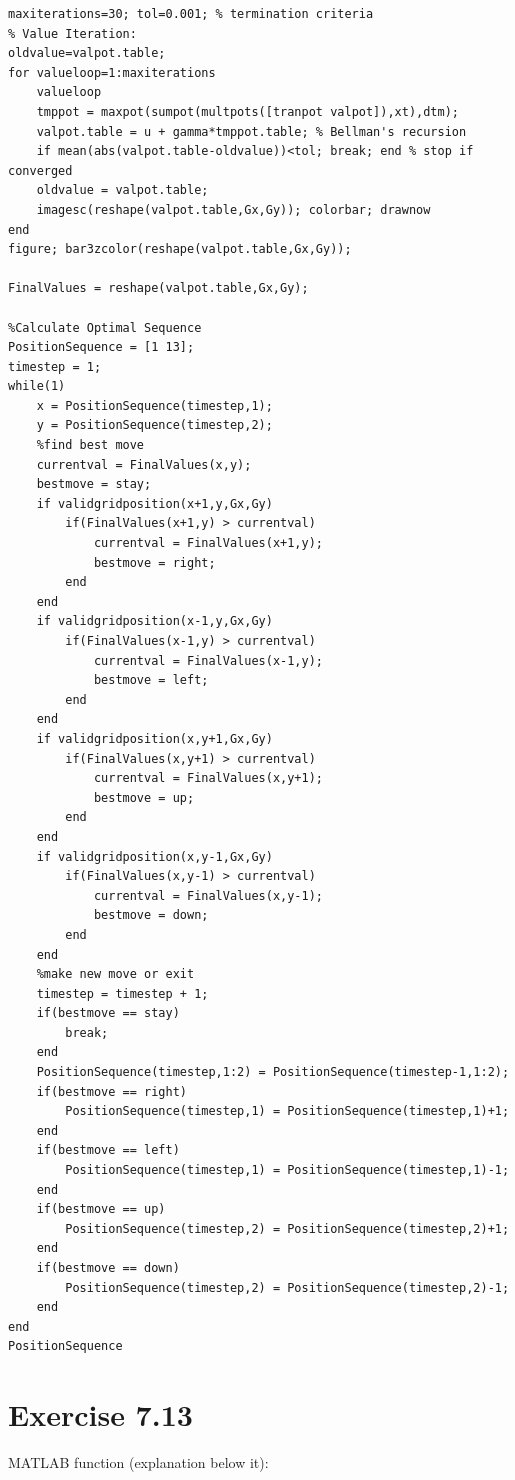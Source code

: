 \documentclass[11pt,a4paper,oneside]{report}
\begin{document}
\begin{lstlisting}
maxiterations=30; tol=0.001; % termination criteria
% Value Iteration:
oldvalue=valpot.table;
for valueloop=1:maxiterations
	valueloop
	tmppot = maxpot(sumpot(multpots([tranpot valpot]),xt),dtm);
	valpot.table = u + gamma*tmppot.table; % Bellman's recursion
	if mean(abs(valpot.table-oldvalue))<tol; break; end % stop if converged
	oldvalue = valpot.table;
	imagesc(reshape(valpot.table,Gx,Gy)); colorbar; drawnow
end
figure; bar3zcolor(reshape(valpot.table,Gx,Gy));

FinalValues = reshape(valpot.table,Gx,Gy);

%Calculate Optimal Sequence
PositionSequence = [1 13];
timestep = 1;
while(1)
    x = PositionSequence(timestep,1);
    y = PositionSequence(timestep,2);
    %find best move
    currentval = FinalValues(x,y);
    bestmove = stay;
    if validgridposition(x+1,y,Gx,Gy)
        if(FinalValues(x+1,y) > currentval)
            currentval = FinalValues(x+1,y);
            bestmove = right;
        end
    end
    if validgridposition(x-1,y,Gx,Gy)
        if(FinalValues(x-1,y) > currentval)
            currentval = FinalValues(x-1,y);
            bestmove = left;
        end
    end
    if validgridposition(x,y+1,Gx,Gy)
        if(FinalValues(x,y+1) > currentval)
            currentval = FinalValues(x,y+1);
            bestmove = up;
        end
    end
    if validgridposition(x,y-1,Gx,Gy)
        if(FinalValues(x,y-1) > currentval)
            currentval = FinalValues(x,y-1);
            bestmove = down;
        end
    end
    %make new move or exit
    timestep = timestep + 1;
    if(bestmove == stay)
        break;
    end
    PositionSequence(timestep,1:2) = PositionSequence(timestep-1,1:2);
    if(bestmove == right)
        PositionSequence(timestep,1) = PositionSequence(timestep,1)+1;
    end
    if(bestmove == left)
        PositionSequence(timestep,1) = PositionSequence(timestep,1)-1;
    end
    if(bestmove == up)
        PositionSequence(timestep,2) = PositionSequence(timestep,2)+1;
    end
    if(bestmove == down)
        PositionSequence(timestep,2) = PositionSequence(timestep,2)-1;
    end
end
PositionSequence
\end{lstlisting}
\section*{Exercise 7.13}

MATLAB function (explanation below it):
\end{document}
